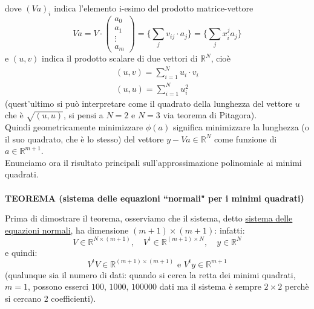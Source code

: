 \documentclass[12pt,a4paper]{article}
\begin{document}
dove $(Va)_i$ indica l'elemento i-esimo
del prodotto matrice-vettore
\[
Va = V \cdot 
\begin{pmatrix}
a_0 \\ a_1 \\ \vdots \\ a_m
\end{pmatrix}
= \{ \sum_j v_{ij} \cdot a_j \} = \{ \sum_j x_i^j a_j \}
\]
e $(u,v)$ indica il prodotto scalare di due vettori di $\mathbb{R}^N$, cioè 
\[
\begin{split}
(u,v) = \sum\limits_{i=1}^N u_i \cdot v_i \\
(u,u) = \sum\limits_{i=1}^N u_i^2
\end{split}
\]
(quest'ultimo si può interpretare come il quadrato della lunghezza del vettore $u$ che è $\sqrt{(u,u)}$, si pensi a $N=2$ e $N=3$ via teorema di Pitagora).\\
Quindi geometricamente minimizzare $\phi(a)$ significa minimizzare la
lunghezza (o il suo quadrato, che è lo stesso) del vettore $y - Va \in \mathbb{R}^N$ come funzione di $a \in \mathbb{R}^{m+1}$.\\
Enunciamo ora il risultato principali sull'approssimazione polinomiale ai minimi quadrati.\\\\
\textbf{TEOREMA (sistema delle equazioni ``normali" per i minimi quadrati)}\\
\begin{center}
\end{center}
Prima di dimostrare il teorema, osserviamo che il sistema, detto \underline{sistema delle equazioni normali}, ha dimensione $(m+1) \times  (m+1)$: infatti:
\[
	V \in \mathbb{R}^{N \times (m+1)}, \quad V^t \in \mathbb{R}^{(m+1) \times N}, \quad y \in \mathbb{R}^{N}
\]
e quindi:
\[
	V^tV \in \mathbb{R}^{(m+1) \times (m+1)} \text{ e } V^ty \in \mathbb{R}^{m+1}
\]
(qualunque sia il numero di dati: quando si cerca la retta dei minimi quadrati, $m=1$, possono esserci $100, \, 1000, \, 100000$ dati ma il sistema è sempre $2 \times 2$ perchè si cercano $2$ coefficienti).\\\\
\end{document}
